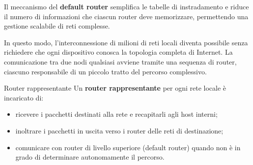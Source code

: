 \documentclass[a4paper,12pt]{report}
\begin{document}
\begin{algorithm}[H]
\SetAlgoLined
\caption{Algoritmo di un router}
\vspace{0.5 cm}

\end{algorithm}

\begin{notebox}{}
Il meccanismo del \textbf{default router} semplifica le tabelle di instradamento e riduce il numero di informazioni che ciascun router deve memorizzare, permettendo una gestione scalabile di reti complesse.
\end{notebox}

In questo modo, l’interconnessione di milioni di reti locali diventa possibile senza richiedere che ogni dispositivo conosca la topologia completa di Internet.  
La comunicazione tra due nodi qualsiasi avviene tramite una sequenza di router, ciascuno responsabile di un piccolo tratto del percorso complessivo.

\begin{defbox}{Router rappresentante}
Un \textbf{router rappresentante} per ogni rete locale è incaricato di:
\begin{itemize}
    \item ricevere i pacchetti destinati alla rete e recapitarli agli host interni;
    \item inoltrare i pacchetti in uscita verso i router delle reti di destinazione;
    \item comunicare con router di livello superiore (default router) quando non è in grado di determinare autonomamente il percorso.
\end{itemize}
\end{defbox}
\end{document}

